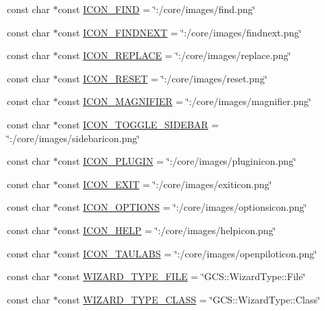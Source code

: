 \begin{DoxyCompactItemize}
\item 
const char $\ast$const \hyperlink{group___core_plugin_ga3b89c61f0a84e424e59a4ced77dfc7d6}{\-I\-C\-O\-N\-\_\-\-F\-I\-N\-D} = \char`\"{}\-:/core/images/find.\-png\char`\"{}
\item 
const char $\ast$const \hyperlink{group___core_plugin_ga324b946ec6414fd10710ae775d10aa96}{\-I\-C\-O\-N\-\_\-\-F\-I\-N\-D\-N\-E\-X\-T} = \char`\"{}\-:/core/images/findnext.\-png\char`\"{}
\item 
const char $\ast$const \hyperlink{group___core_plugin_gae0384d1d37d0903712f93ddbb23151ef}{\-I\-C\-O\-N\-\_\-\-R\-E\-P\-L\-A\-C\-E} = \char`\"{}\-:/core/images/replace.\-png\char`\"{}
\item 
const char $\ast$const \hyperlink{group___core_plugin_ga454f3d18360ca06c47eff68a75b1c868}{\-I\-C\-O\-N\-\_\-\-R\-E\-S\-E\-T} = \char`\"{}\-:/core/images/reset.\-png\char`\"{}
\item 
const char $\ast$const \hyperlink{group___core_plugin_ga1e2534739ffcaae9d53b457e978b838a}{\-I\-C\-O\-N\-\_\-\-M\-A\-G\-N\-I\-F\-I\-E\-R} = \char`\"{}\-:/core/images/magnifier.\-png\char`\"{}
\item 
const char $\ast$const \hyperlink{group___core_plugin_gaabc42a8c430c6106655594c1bf624b9e}{\-I\-C\-O\-N\-\_\-\-T\-O\-G\-G\-L\-E\-\_\-\-S\-I\-D\-E\-B\-A\-R} = \char`\"{}\-:/core/images/sidebaricon.\-png\char`\"{}
\item 
const char $\ast$const \hyperlink{group___core_plugin_ga9f234fb33ceb5b9f3f840c6934e979ed}{\-I\-C\-O\-N\-\_\-\-P\-L\-U\-G\-I\-N} = \char`\"{}\-:/core/images/pluginicon.\-png\char`\"{}
\item 
const char $\ast$const \hyperlink{group___core_plugin_ga8dcf1931b14f2911a175a1946d94afb8}{\-I\-C\-O\-N\-\_\-\-E\-X\-I\-T} = \char`\"{}\-:/core/images/exiticon.\-png\char`\"{}
\item 
const char $\ast$const \hyperlink{group___core_plugin_gac73aa396739bdb0badac34e06112b536}{\-I\-C\-O\-N\-\_\-\-O\-P\-T\-I\-O\-N\-S} = \char`\"{}\-:/core/images/optionsicon.\-png\char`\"{}
\item 
const char $\ast$const \hyperlink{group___core_plugin_gacfd62907dace8bb425a3d9d01e953de6}{\-I\-C\-O\-N\-\_\-\-H\-E\-L\-P} = \char`\"{}\-:/core/images/helpicon.\-png\char`\"{}
\item 
const char $\ast$const \hyperlink{group___core_plugin_ga04096dc16c442e5d5ececcfbcf814d16}{\-I\-C\-O\-N\-\_\-\-T\-A\-U\-L\-A\-B\-S} = \char`\"{}\-:/core/images/openpiloticon.\-png\char`\"{}
\item 
const char $\ast$const \hyperlink{group___core_plugin_gaf62e2001aebfd40c32959c72bbcde85e}{\-W\-I\-Z\-A\-R\-D\-\_\-\-T\-Y\-P\-E\-\_\-\-F\-I\-L\-E} = \char`\"{}\-G\-C\-S\-::\-Wizard\-Type\-::\-File\char`\"{}
\item 
const char $\ast$const \hyperlink{group___core_plugin_ga1d52af0d7f4a06e08434978debff7211}{\-W\-I\-Z\-A\-R\-D\-\_\-\-T\-Y\-P\-E\-\_\-\-C\-L\-A\-S\-S} = \char`\"{}\-G\-C\-S\-::\-Wizard\-Type\-::\-Class\char`\"{}
\end{DoxyCompactItemize}
